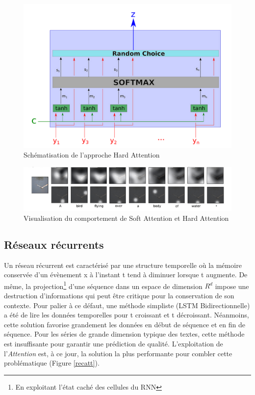 \begin{figure}
    \centering
    \includegraphics[scale=0.4]{./tex/attention-deep-learning/hard.png}
    \caption{Schématisation de l'approche Hard Attention}
    \label{hardatt}
\end{figure}

\begin{figure}
    \centering
    \includegraphics[scale=0.4]{./tex/attention-deep-learning/attbird.png}
    \caption{Visualisation du comportement de Soft Attention et Hard Attention}
    \label{birdatt}
\end{figure}


\subsection{Réseaux récurrents}
Un réseau récurrent est caractérisé par une structure temporelle où la mémoire conservée d'un évènement x à l'instant t tend à diminuer lorsque t augmente. De même, la projection\footnote{En exploitant l'état caché des cellules du RNN} d'une séquence dans un espace de dimension $R^d$ impose une destruction d'informations qui peut être critique pour la conservation de son contexte. Pour palier à ce défaut, une méthode simpliste (LSTM Bidirectionnelle) a été de lire les données temporelles pour t croissant et t décroissant. Néanmoins, cette solution favorise grandement les données en début de séquence et en fin de séquence. Pour les séries de grande dimension typique des textes, cette méthode est insuffisante pour garantir une prédiction de qualité. L'exploitation de l'\textit{Attention} est, à ce jour, la solution la plus performante pour combler cette problématique (Figure \ref{recatt}).

